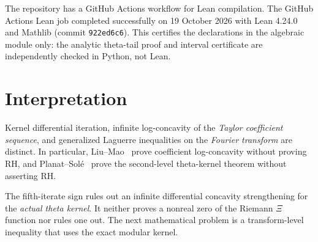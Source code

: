 The repository has a GitHub Actions workflow for Lean compilation.
The GitHub Actions Lean job completed successfully on 19 October
2026 with Lean 4.24.0 and Mathlib (commit \texttt{922ed6c6}).
This certifies the declarations in the algebraic module only:
the analytic theta-tail proof and interval certificate are
independently checked in Python, not Lean.

\section{Interpretation}
Kernel differential iteration, infinite log-concavity of the
\emph{Taylor coefficient sequence}, and generalized Laguerre
inequalities on the \emph{Fourier transform} are distinct.
In particular, Liu--Mao~\cite{LM} prove coefficient
log-concavity without proving RH, and Planat--Sol\'e~\cite{PS}
prove the second-level theta-kernel theorem without asserting RH.

The fifth-iterate sign rules out an infinite differential
concavity strengthening for the \emph{actual theta kernel}.
It neither proves a nonreal zero of the Riemann $\Xi$ function
nor rules one out. The next mathematical problem is a
transform-level inequality that uses the exact modular kernel.


